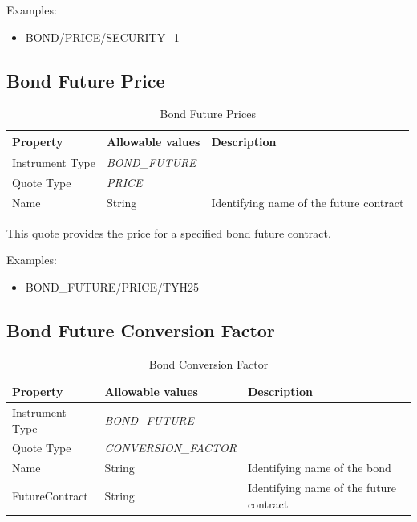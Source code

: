 \medskip
Examples:
\begin{itemize}
	\item BOND/PRICE/SECURITY\_1
\end{itemize}

\subsection{Bond Future Price}

\begin{table}[H]
\centering
  \begin{tabular}{|p{3cm}|p{3.5cm}|p{7cm}|}
  \hline
  {\bf Property} & {\bf Allowable values} & {\bf Description} \\ \hline
    Instrument Type & \emph{BOND\_FUTURE} & \\ \hline
    Quote Type & \emph{PRICE} & \\ \hline
    Name & String & Identifying name of the future contract \\ \hline
  \end{tabular}
  \caption{Bond Future Prices}
  \label{tab:bondfutureprice_quote}
\end{table}

This quote provides the price for a specified bond future contract.

\medskip
Examples:
\begin{itemize}
	\item BOND\_FUTURE/PRICE/TYH25
\end{itemize}

\subsection{Bond Future Conversion Factor}

\begin{table}[H]
\centering
  \begin{tabular}{|p{3cm}|p{3.5cm}|p{7cm}|}
  \hline
  {\bf Property} & {\bf Allowable values} & {\bf Description} \\ \hline
    Instrument Type & \emph{BOND\_FUTURE} & \\ \hline
    Quote Type & \emph{CONVERSION\_FACTOR} & \\ \hline
    Name & String & Identifying name of the bond \\ \hline
    FutureContract & String & Identifying name of the future contract \\ \hline
  \end{tabular}
  \caption{Bond Conversion Factor}
  \label{tab:bond_future_conversion_factor}
\end{table}


